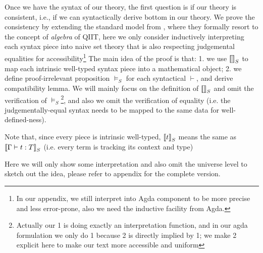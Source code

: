 Once we have the syntax of our theory, the first question is if our theory is consistent, i.e., if we can syntactically derive bottom in our theory. We prove the consistency by extending the standard model from \citep{kaposi2017type, kaposi2019gluing}, where they formally resort to the concept of \textit{algebra} of QIIT, here we only consider inductively interpreting each syntax piece into naive set theory that is also respecting judgemental equalities for accessibility\footnote{In our appendix, we still interpret into Agda component to be more precise and less error-prone, also we need the inductive facility from Agda.} The main idea of the proof is that: 1. we use ${{\llbracket {} \rrbracket}_S}$ to map each intrinsic well-typed syntax piece into a mathematical object; 2. we define proof-irrelevant proposition $\models_S$ for each syntactical $\vdash$, and derive compatibility lemma. We will mainly focus on the definition of ${{\llbracket {} \rrbracket}_S}$ and omit the verification of $\models_S$\footnote{Actually our 1 is doing exactly an interpretation function, and in our agda formulation we only do 1 because 2 is directly implied by 1; we make 2 explicit here to make our text more accessible and uniform}, and also we omit the verification of equality (i.e. the judgementally-equal syntax needs to be mapped to the same data for well-defined-ness).

Note that, since every piece is intrinsic well-typed, ${{\llbracket {t} \rrbracket}_S}$ means the same as ${{\llbracket {{ {\Gamma} \vdash {t} : {T} }} \rrbracket}_S}$ (i.e. every term is tracking its context and type)

Here we will only show some interpretation and also omit the universe level to sketch out the idea, please refer to appendix for the complete version. 

\newcommand{\goodCtxS}[2]{{ {#1} \ \models_S }}
\newcommand{\goodTypeS}[3]{{ {#1} \models_S {#2} }}
\newcommand{\goodTermS}[3]{{ {#1} \models_S {#2} : {#3} }}
\newcommand{\goodSubS}[3]{{ {#1} \models_S {#2} : {#3} }}
\newcommand{\goodSigS}[3]{{ {#1} \models_S {#2} \ \  Sig^{#3} }}
\newcommand{\goodWSigS}[3]{{ {#1} \models_S {#2} \ \ WSig^{#3} }}
\newcommand{\goodSealS}[4]{{ {#1} \models_S {#2} : {#3} \  |\  {#4} }}
\newcommand{\goodInhS}[4]{{ {#1} \models_S {#2} : {#3} \twoheadrightarrow {#4}}}

